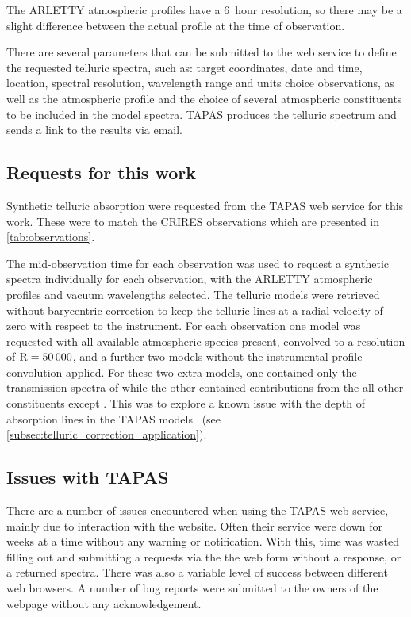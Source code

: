 The {ARLETTY} atmospheric profiles have a 6~hour resolution, so there may be a slight difference between the actual profile at the time of observation.

There are several parameters that can be submitted to the web service to define the requested telluric spectra, such as: target coordinates, date and time, location, spectral resolution, wavelength range and units choice observations, as well as the atmospheric profile and the choice of several atmospheric constituents to be included in the model spectra. {TAPAS} produces the telluric spectrum and sends a link to the results via email.


\subsection{Requests for this work}
Synthetic telluric absorption were requested from the {TAPAS} web service for this work.
These were to match the CRIRES observations which are presented in \cref{tab:observations}.

The mid-observation time for each observation was used to request a synthetic spectra individually for each observation, with the {ARLETTY} atmospheric profiles and vacuum wavelengths selected.
The telluric models were retrieved without barycentric correction to keep the telluric lines at a radial velocity of zero with respect to the instrument.
For each observation one model was requested with all available atmospheric species present, convolved to a resolution of \(\rm R=50\,000\), and a further two models without the instrumental profile convolution applied.
For these two extra models, one contained only the transmission spectra of  while the other contained contributions from the all other constituents except .
This was to explore a known issue with the depth of  absorption lines in the {TAPAS} models~\citet{bertaux_tapas_2014} (see \cref{subsec:telluric_correction_application}).

\subsection{Issues with {TAPAS}}
There are a number of issues encountered when using the {TAPAS} web service, mainly due to interaction with the website.
Often their service were down for weeks at a time without any warning or notification.
With this, time was wasted filling out and submitting a requests via the the web form without a response, or a returned spectra.
There was also a variable level of success between different web browsers.
A number of bug reports were submitted to the owners of the webpage without any acknowledgement.

